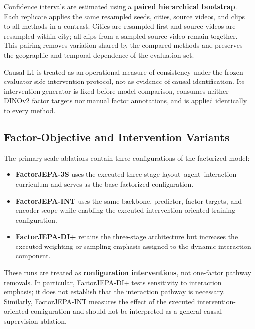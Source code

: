 Confidence intervals are estimated using a
\textbf{paired hierarchical bootstrap}. Each replicate applies the same
resampled seeds, cities, source videos, and clips to all methods in a
contrast. Cities are resampled first and source videos are resampled
within city; all clips from a sampled source video remain together.
This pairing removes variation shared by the compared methods and
preserves the geographic and temporal dependence of the evaluation
set.

Causal L1 is treated as an operational measure of consistency under
the frozen evaluator-side intervention protocol, not as evidence of
causal identification. Its intervention generator is fixed before
model comparison, consumes neither DINOv2 factor targets nor manual
factor annotations, and is applied identically to every method.


\subsection{Factor-Objective and Intervention Variants}
\label{app:attribution_factor_variants}

The primary-scale ablations contain three configurations of the
factorized model:

\begin{itemize}
    \item \textbf{FactorJEPA-3S} uses the executed three-stage
    layout--agent--interaction curriculum and serves as the base
    factorized configuration.

    \item \textbf{FactorJEPA-INT} uses the same backbone, predictor,
    factor targets, and encoder scope while enabling the executed
    intervention-oriented training configuration.

    \item \textbf{FactorJEPA-DI+} retains the three-stage architecture
    but increases the executed weighting or sampling emphasis assigned
    to the dynamic-interaction component.
\end{itemize}

These runs are treated as \textbf{configuration interventions}, not
one-factor pathway removals. In particular, FactorJEPA-DI+ tests
sensitivity to interaction emphasis; it does not establish that the
interaction pathway is necessary. Similarly, FactorJEPA-INT measures
the effect of the executed intervention-oriented configuration and
should not be interpreted as a general causal-supervision ablation.


